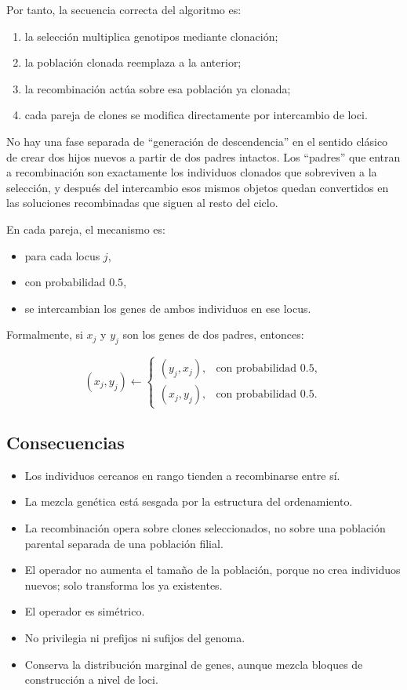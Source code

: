 \documentclass[11pt]{article}
\begin{document}
Por tanto, la secuencia correcta del algoritmo es:

\begin{enumerate}
  \item la selecci\'on multiplica genotipos mediante clonaci\'on;
  \item la poblaci\'on clonada reemplaza a la anterior;
  \item la recombinaci\'on act\'ua sobre esa poblaci\'on ya clonada;
  \item cada pareja de clones se modifica directamente por intercambio de
  loci.
\end{enumerate}

No hay una fase separada de ``generaci\'on de descendencia'' en el sentido
cl\'asico de crear dos hijos nuevos a partir de dos padres intactos. Los
``padres'' que entran a recombinaci\'on son exactamente los individuos clonados
que sobreviven a la selecci\'on, y despu\'es del intercambio esos mismos
objetos quedan convertidos en las soluciones recombinadas que siguen al resto
del ciclo.

En cada pareja, el mecanismo es:

\begin{itemize}
  \item para cada locus \(j\),
  \item con probabilidad \(0.5\),
  \item se intercambian los genes de ambos individuos en ese locus.
\end{itemize}

Formalmente, si \(x_j\) y \(y_j\) son los genes de dos padres, entonces:

\[
(x_j, y_j) \leftarrow
\begin{cases}
(y_j, x_j), & \text{con probabilidad } 0.5, \\
(x_j, y_j), & \text{con probabilidad } 0.5.
\end{cases}
\]

\subsection{Consecuencias}

\begin{itemize}
  \item Los individuos cercanos en rango tienden a recombinarse entre s\'i.
  \item La mezcla gen\'etica est\'a sesgada por la estructura del ordenamiento.
  \item La recombinaci\'on opera sobre clones seleccionados, no sobre una
  poblaci\'on parental separada de una poblaci\'on filial.
  \item El operador no aumenta el tama\~no de la poblaci\'on, porque no crea
  individuos nuevos; solo transforma los ya existentes.
  \item El operador es sim\'etrico.
  \item No privilegia ni prefijos ni sufijos del genoma.
  \item Conserva la distribuci\'on marginal de genes, aunque mezcla bloques de
  construcci\'on a nivel de loci.
\end{itemize}
\end{document}
